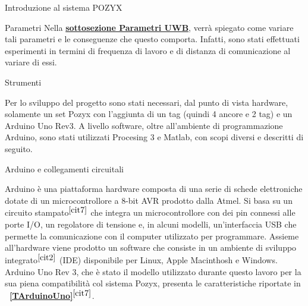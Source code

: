 \documentclass[12pt]{report}
\begin{document}
\begin{section}{Introduzione al sistema POZYX}
\begin{subsection}{Parametri}
		Nella \hyperlink{SS1}{\textbf{sottosezione Parametri UWB}}, verrà spiegato come variare tali parametri e le conseguenze che questo comporta. Infatti, sono stati effettuati esperimenti in termini di frequenza di lavoro e di distanza di comunicazione al variare di essi.

	\end{subsection}

	\end{section}
	\newpage

	\begin{section}{Strumenti}
	
	Per lo sviluppo del progetto sono stati necessari, dal punto di vista hardware, solamente un set Pozyx con l’aggiunta di un tag (quindi 4 ancore e 2 tag) e un Arduino Uno Rev3.
	A livello software, oltre all'ambiente di programmazione Arduino, sono stati utilizzati Procesing 3 e Matlab, con scopi diversi e descritti di seguito.

	\begin{subsection}{Arduino e collegamenti circuitali}

		Arduino è una piattaforma hardware composta di una serie di schede elettroniche dotate di un microcontrollore a 8-bit AVR prodotto dalla Atmel. Si basa su un circuito stampato$^{{\cite{cit7}}}$ che integra un microcontrollore con dei pin connessi alle porte I/O, un regolatore di tensione e, in alcuni modelli, 					un'interfaccia USB che permette la comunicazione con il computer utilizzato per programmare. Assieme all’hardware viene prodotto un software che consiste in un ambiente di sviluppo integrato$^{{\cite{cit2}}}$ (IDE) disponibile per Linux, Apple Macinthosh e Windows.\\
		Arduino Uno Rev 3, che è stato il modello utilizzato durante questo lavoro per la sua piena compatibilità col sistema Pozyx, presenta le caratteristiche riportate in \textbf{\tablename~\ref{TArduinoUno}}$^{{\cite{cit7}}}$.


\end{subsection}
\end{section}
\end{document}
